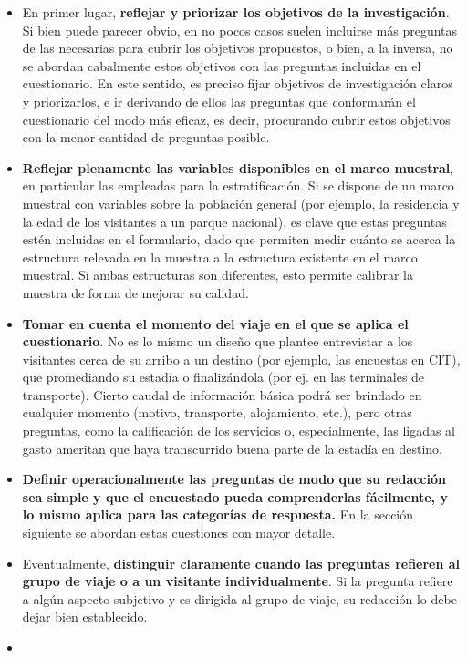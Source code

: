 \documentclass[
]{book}
\begin{document}
\begin{itemize}
\item
  En primer lugar, \textbf{reflejar y priorizar los objetivos de la investigación}. Si bien puede parecer obvio, en no pocos casos suelen incluirse más preguntas de las necesarias para cubrir los objetivos propuestos, o bien, a la inversa, no se abordan cabalmente estos objetivos con las preguntas incluidas en el cuestionario. En este sentido, es preciso fijar objetivos de investigación claros y priorizarlos, e ir derivando de ellos las preguntas que conformarán el cuestionario del modo más eficaz, es decir, procurando cubrir estos objetivos con la menor cantidad de preguntas posible.
\item
  \textbf{Reflejar plenamente las variables disponibles en el marco muestral}, en particular las empleadas para la estratificación. Si se dispone de un marco muestral con variables sobre la población general (por ejemplo, la residencia y la edad de los visitantes a un parque nacional), es clave que estas preguntas estén incluidas en el formulario, dado que permiten medir cuánto se acerca la estructura relevada en la muestra a la estructura existente en el marco muestral. Si ambas estructuras son diferentes, esto permite calibrar la muestra de forma de mejorar su calidad.
\item
  \textbf{Tomar en cuenta el momento del viaje en el que se aplica el cuestionario}. No es lo mismo un diseño que plantee entrevistar a los visitantes cerca de su arribo a un destino (por ejemplo, las encuestas en CIT), que promediando su estadía o finalizándola (por ej. en las terminales de transporte). Cierto caudal de información básica podrá ser brindado en cualquier momento (motivo, transporte, alojamiento, etc.), pero otras preguntas, como la calificación de los servicios o, especialmente, las ligadas al gasto ameritan que haya transcurrido buena parte de la estadía en destino.
\item
  \textbf{Definir operacionalmente las preguntas de modo que su redacción sea simple y que el encuestado pueda comprenderlas fácilmente, y lo mismo aplica para las categorías de respuesta.} En la sección siguiente se abordan estas cuestiones con mayor detalle.
\item
  Eventualmente, \textbf{distinguir claramente cuando las preguntas refieren al grupo de viaje o a un visitante individualmente}. Si la pregunta refiere a algún aspecto subjetivo y es dirigida al grupo de viaje, su redacción lo debe dejar bien establecido.
\item

\end{itemize}
\end{document}
